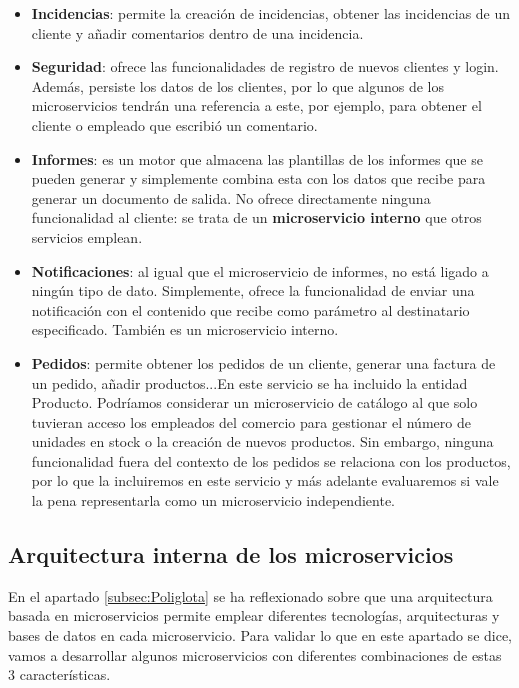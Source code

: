 \documentclass[11pt,spanish,listoffigures]{tfgetsinf}
\begin{document}
\begin{itemize}

\item \textbf{Incidencias}: permite la creación de incidencias, obtener las incidencias de un cliente y añadir comentarios dentro de una incidencia.

\item \textbf{Seguridad}: ofrece las funcionalidades de registro de nuevos clientes y login. Además, persiste los datos de los clientes, por lo que algunos de los microservicios tendrán una referencia a este, por ejemplo, para obtener el cliente o empleado que escribió un comentario.

\item \textbf{Informes}: es un motor que almacena las plantillas de los informes que se pueden generar y simplemente combina esta con los datos que recibe para generar un documento de salida. No ofrece directamente ninguna funcionalidad al cliente: se trata de un \textbf{microservicio interno} que otros servicios emplean.

\item \textbf{Notificaciones}: al igual que el microservicio de informes, no está ligado a ningún tipo de dato. Simplemente, ofrece la funcionalidad de enviar una notificación con el contenido que recibe como parámetro al destinatario especificado. También es un microservicio interno.

\item \textbf{Pedidos}: permite obtener los pedidos de un cliente, generar una factura de un pedido, añadir productos...En este servicio se ha incluido la entidad Producto. Podríamos considerar un microservicio de catálogo al que solo tuvieran acceso los empleados del comercio para gestionar el número de unidades en stock o la creación de nuevos productos. Sin embargo, ninguna funcionalidad fuera del contexto de los pedidos se relaciona con los productos, por lo que la incluiremos en este servicio y más adelante evaluaremos si vale la pena representarla como un microservicio independiente. 

\end{itemize}

\subsection{Arquitectura interna de los microservicios}

En el apartado \ref{subsec:Poliglota}  se ha reflexionado sobre que una arquitectura basada en microservicios permite emplear diferentes tecnologías, arquitecturas y bases de datos en cada microservicio. Para validar lo que en este apartado se dice, vamos a desarrollar algunos microservicios con diferentes combinaciones de estas 3 características.
\end{document}
